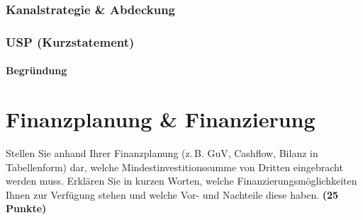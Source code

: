 \documentclass[
%
ngerman %
%
numeric %
]{wbh-assignment}
\begin{document}
\vspace*{5mm}

\subsubsection{Kanalstrategie \& Abdeckung}

\subsubsection{USP (Kurzstatement)}

\paragraph{Begründung}


\section{Finanzplanung \& Finanzierung}
\label{sec:finanzplanung}

\begin{aufgabenstellung}
Stellen Sie anhand Ihrer Finanzplanung (z.\,B. GuV, Cashflow, Bilanz in Tabellenform) dar, welche Mindestinvestitionssumme von Dritten eingebracht werden muss. Erklären Sie in kurzen Worten, welche Finanzierungsmöglichkeiten Ihnen zur Verfügung stehen und welche Vor- und Nachteile diese haben. \textbf{(25 Punkte)}
\end{aufgabenstellung}

\vspace*{5mm}
\end{document}
